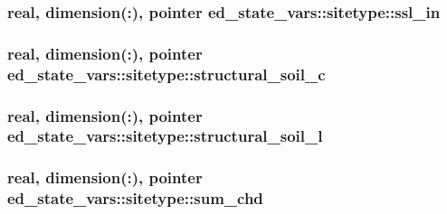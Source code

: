 \subsubsection[{\texorpdfstring{ssl\+\_\+in}{ssl_in}}]{\setlength{\rightskip}{0pt plus 5cm}real, dimension(\+:), pointer ed\+\_\+state\+\_\+vars\+::sitetype\+::ssl\+\_\+in}\hypertarget{structed__state__vars_1_1sitetype_a5b0c0a67ee904f1c1ab9f4a181d72912}{}\label{structed__state__vars_1_1sitetype_a5b0c0a67ee904f1c1ab9f4a181d72912}
\subsubsection[{\texorpdfstring{structural\+\_\+soil\+\_\+c}{structural_soil_c}}]{\setlength{\rightskip}{0pt plus 5cm}real, dimension(\+:), pointer ed\+\_\+state\+\_\+vars\+::sitetype\+::structural\+\_\+soil\+\_\+c}\hypertarget{structed__state__vars_1_1sitetype_aee8bee977f25a60319784ce6ee94ff54}{}\label{structed__state__vars_1_1sitetype_aee8bee977f25a60319784ce6ee94ff54}
\subsubsection[{\texorpdfstring{structural\+\_\+soil\+\_\+l}{structural_soil_l}}]{\setlength{\rightskip}{0pt plus 5cm}real, dimension(\+:), pointer ed\+\_\+state\+\_\+vars\+::sitetype\+::structural\+\_\+soil\+\_\+l}\hypertarget{structed__state__vars_1_1sitetype_a9c255d95042c70673bac939d49464334}{}\label{structed__state__vars_1_1sitetype_a9c255d95042c70673bac939d49464334}
\subsubsection[{\texorpdfstring{sum\+\_\+chd}{sum_chd}}]{\setlength{\rightskip}{0pt plus 5cm}real, dimension(\+:), pointer ed\+\_\+state\+\_\+vars\+::sitetype\+::sum\+\_\+chd}\hypertarget{structed__state__vars_1_1sitetype_a9959f28847dcb2cda62a1873973fef60}{}\label{structed__state__vars_1_1sitetype_a9959f28847dcb2cda62a1873973fef60}
